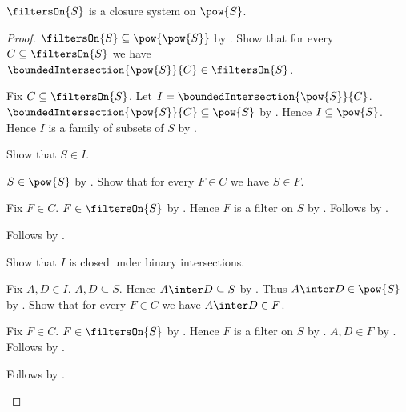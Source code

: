 \begin{theorem}\label{filters_on_is_closure_system}
    $\filtersOn{S}$ is a closure system on $\pow{S}$.
\end{theorem}
\begin{proof}
    $\filtersOn{S}\subseteq\pow{\pow{S}}$ by
        .
    Show that for every $C\subseteq\filtersOn{S}$ we have
        $\boundedIntersection{\pow{S}}{C}\in\filtersOn{S}$.
    \begin{subproof}
        Fix $C\subseteq\filtersOn{S}$.
        Let $I=\boundedIntersection{\pow{S}}{C}$.
        $\boundedIntersection{\pow{S}}{C}\subseteq\pow{S}$ by
            .
        Hence $I\subseteq\pow{S}$.
        Hence $I$ is a family of subsets of $S$ by
            .

        Show that $S\in I$.
        \begin{subproof}
            $S\in\pow{S}$ by .
            Show that for every $F\in C$ we have $S\in F$.
            \begin{subproof}
                Fix $F\in C$.
                $F\in\filtersOn{S}$ by .
                Hence $F$ is a filter on $S$ by
                    .
                Follows by .
            \end{subproof}
            Follows by .
        \end{subproof}

        Show that $I$ is closed under binary intersections.
        \begin{subproof}
            Fix $A,D\in I$.
            $A,D\subseteq S$.
            Hence $A\inter D\subseteq S$ by .
            Thus $A\inter D\in\pow{S}$ by .
            Show that for every $F\in C$ we have $A\inter D\in F$.
            \begin{subproof}
                Fix $F\in C$.
                $F\in\filtersOn{S}$ by .
                Hence $F$ is a filter on $S$ by
                    .
                $A,D\in F$ by .
                Follows by .
            \end{subproof}
            Follows by .
        \end{subproof}


\end{subproof}
\end{proof}
